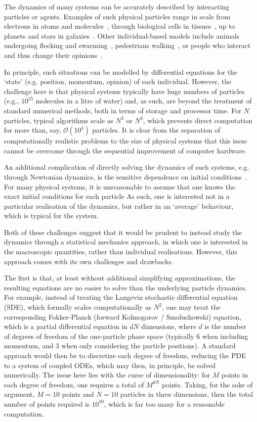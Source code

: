 The dynamics of many systems can be accurately described by interacting particles or agents.  Examples of 
such physical particles range in scale from electrons in atoms and molecules~\cite{SO12}, 
through biological cells in tissues~\cite{ACGL12}, up to planets and stars in galaxies~\cite{BT11}.  
Other individual-based models include
animals undergoing flocking and swarming~\cite{YBEM10}, pedestrians walking~\cite{CPT14}, 
or people who interact and thus change their opinions~\cite{L07}.

In principle, such situations can be modelled by differential equations for the `state' (e.g. position, momentum,
opinion) of each individual.  However, the challenge here is that physical systems typically have huge numbers
of particles (e.g., $10^{25}$ molecules in a litre of water) and, as such, are beyond the treatment of standard
numerical methods, both in terms of storage and processor time.  For $N$ particles, typical algorithms scale
as $N^2$ or $N^3$, which prevents direct computation for more than, say, $\mathcal{O}(10^4)$
particles.  It is clear from the separation of computationally realistic problems to the size of physical systems
that this issue cannot be overcome through the sequential improvement of computer hardware.

An additional complication of directly solving the dynamics of such systems, e.g. through Newtonian dynamics,
is the sensitive dependence on initial conditions~\cite{LM16}.  For many physical systems, 
it is unreasonable to assume that one knows the exact initial conditions for each particle  As such, one is interested
not in a particular realisation of the dynamics, but rather in an `average' behaviour, which is typical for
the system.

Both of these challenges suggest that it would be prudent to instead study the dynamics through a statistical
mechanics approach, in which one is interested in the macroscopic quantities, rather than individual realisations.
However, this approach comes with its own challenges and drawbacks.  

The first is that, at least without 
additional simplifying approximations, the resulting equations are no easier to solve than the underlying
particle dynamics.  For example, instead of treating the Langevin stochastic differential equation (SDE), which 
formally scales computationally as $N^2$, one may treat the corresponding Fokker-Planck (forward Kolmogorov / Smoluchowski)
equation, which is a partial differential equation in $dN$ dimensions, where $d$ is the number of degrees of
freedom of the one-particle phase space (typically 6 when including momentum, and 3 when only considering the
particle positions).  A standard approach would then be to discretize each degree of freedom, reducing the
PDE to a system of coupled ODEs, which  may then, in principle, be solved numerically.  The issue here lies
with the curse of dimensionality: for $M$ points in each degree of freedom, one requires a total of $M^{dN}$ points.
Taking, for the sake of argument, $M=10$ points and $N=10$ particles in three dimensions, 
then the total number of points required is $10^{30}$, which is far too many for a reasonable computation.

